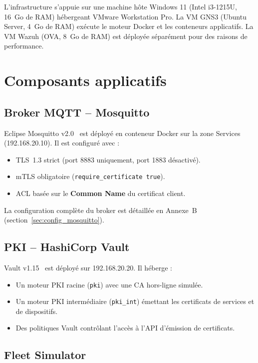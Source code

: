 L'infrastructure s'appuie sur une machine hôte Windows 11 (Intel i3-1215U, 16~Go de RAM) hébergeant VMware Workstation Pro. La VM GNS3 (Ubuntu Server, 4~Go de RAM) exécute le moteur Docker et les conteneurs applicatifs. La VM Wazuh (OVA, 8~Go de RAM) est déployée séparément pour des raisons de performance.

\section{Composants applicatifs}

\subsection{Broker MQTT -- Mosquitto}

Eclipse Mosquitto v2.0~\cite{mosquitto_tls} est déployé en conteneur Docker sur la zone Services (192.168.20.10). Il est configuré avec :
\begin{itemize}
  \item TLS~1.3 strict (port 8883 uniquement, port 1883 désactivé).
  \item mTLS obligatoire (\texttt{require\_certificate true}).
  \item ACL basée sur le \textbf{Common Name} du certificat client.
\end{itemize}

La configuration complète du broker est détaillée en Annexe~B (section~\ref{sec:config_mosquitto}).

\subsection{PKI -- HashiCorp Vault}

Vault v1.15~\cite{vault_pki} est déployé sur 192.168.20.20. Il héberge :
\begin{itemize}
  \item Un moteur PKI racine (\texttt{pki}) avec une CA hors-ligne simulée.
  \item Un moteur PKI intermédiaire (\texttt{pki\_int}) émettant les certificats de services et de dispositifs.
  \item Des politiques Vault contrôlant l'accès à l'API d'émission de certificats.
\end{itemize}

\subsection{Fleet Simulator}

